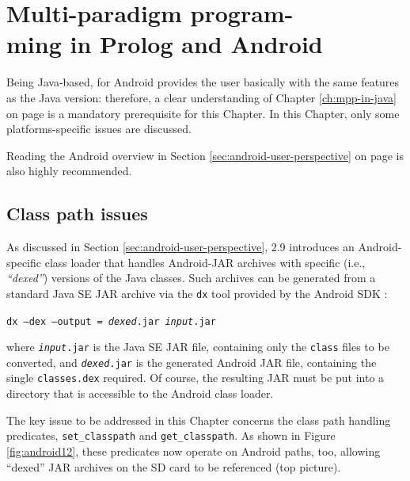 \chapter[Multi-paradigm programming in Prolog and Android]{Multi-paradigm program-\\ming in Prolog and Android}
\label{ch:mpp-in-android}

Being Java-based, \tuprolog{} for Android provides the user basically with the same features as the Java version: therefore, a clear understanding of Chapter \ref{ch:mpp-in-java} on page \pageref{ch:mpp-in-java} is a mandatory prerequisite for this Chapter.
In this Chapter, only some platforms-specific issues are discussed.

Reading the Android overview in Section \ref{sec:android-user-perspective} on page \pageref{sec:android-user-perspective} is also highly recommended.

\section{Class path issues}
\label{sec:android-mpp-classloading-issues}

As discussed in Section \ref{sec:android-user-perspective}, \tuprolog{} 2.9 introduces an Android-specific class loader that handles Android-JAR archives with specific (i.e., \textit{``dexed''}) versions of the Java classes.
Such archives can be generated from a standard Java SE JAR archive via the \texttt{dx} tool provided by the Android SDK :
%
\begin{center}
\texttt{dx --dex --output = \textit{dexed}.jar \textit{input}.jar}
\end{center}
%
\noindent where \texttt{\textit{input}.jar} is the Java SE JAR file, containing only the \texttt{class} files to be converted, and \texttt{\textit{dexed}.jar} is the generated Android JAR file, containing the single \texttt{classes.dex} required.
%
Of course, the resulting JAR must be put into a directory that is accessible to the Android class loader.

The key issue to be addressed in this Chapter concerns the class path handling predicates, \texttt{set\_classpath} and \texttt{get\_classpath}.
As shown in Figure \ref{fig:android12}, these predicates now operate on Android paths, too, allowing ``dexed'' JAR archives on the SD card to be referenced (top picture). 

